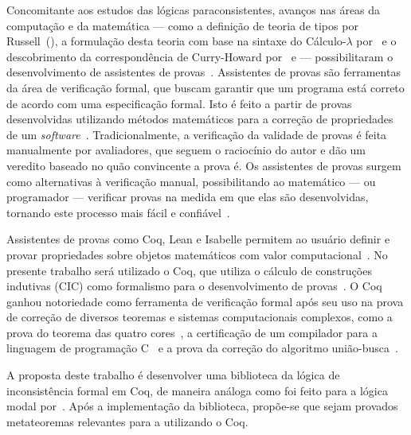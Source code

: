 Concomitante aos estudos das lógicas paraconsistentes, avanços nas áreas da computação e da matemática {---} como a definição de teoria de tipos por Russell~(\citeyear{russell1903principles,Russell1908-RUSMLA}), a formulação desta teoria com base na sintaxe do Cálculo-$\lambda$ por~ e o descobrimento da correspondência de Curry-Howard por~ e  {---} possibilitaram o desenvolvimento de assistentes de provas~\cite{harrison2014history}. Assistentes de provas são ferramentas da área de verificação formal, que buscam garantir que um programa está correto de acordo com uma especificação formal. Isto é feito a partir de provas desenvolvidas utilizando métodos matemáticos para a correção de propriedades de um \textit{software}~\cite{Chlipala_2013}. Tradicionalmente, a verificação da validade de provas é feita manualmente por avaliadores, que seguem o raciocínio do autor e dão um veredito baseado no quão convincente a prova é. Os assistentes de provas surgem como alternativas à verificação manual, possibilitando ao matemático {---} ou programador {---} verificar provas na medida em que elas são desenvolvidas, tornando este processo mais fácil e confiável~\cite{paulinmohring:hal-01094195}.

Assistentes de provas como Coq, Lean e Isabelle permitem ao usuário definir e provar propriedades sobre objetos matemáticos com valor computacional~\cite{geuvers2009proof}. No presente trabalho será utilizado o Coq, que utiliza o cálculo de construções indutivas (CIC) como formalismo para o desenvolvimento de provas~\cite{TEAM_2024}. O Coq ganhou notoriedade como ferramenta de verificação formal após seu uso na prova de correção de diversos teoremas e sistemas computacionais complexos, como a prova do teorema das quatro cores~\cite{geuvers2009proof}, a certificação de um compilador para a linguagem de programação C~\cite{leroy2021compcert} e a prova da correção do algoritmo união-busca~\cite{union-find}.

A proposta deste trabalho é desenvolver uma biblioteca da lógica de inconsistência formal \lfium{} em Coq, de maneira análoga como foi feito para a lógica modal por~. Após a implementação da biblioteca, propõe-se que sejam provados metateoremas relevantes para a \lfium{} utilizando o Coq.



